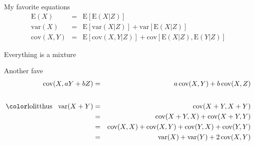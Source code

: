 \documentclass[aspectratio=169,12pt,t]{beamer}
\begin{document}
\begin{frame}[c]{My favorite equations}
  \begin{eqnarray*}
    \text{E}(X) & = & \text{E}[ \text{E}(X|Z) ] \\[18pt]
    \text{var}(X) & = & \text{E}[ \text{var}(X|Z) ] + \text{var}[ \text{E}(X|Z) ] \\[18pt]
    \text{cov}(X,Y) & = & \text{E}[ \text{cov}(X,Y|Z) ] + \text{cov}[ \text{E}(X|Z), \text{E}(Y|Z) ]
  \end{eqnarray*}

  \bigskip\bigskip

  \hfill {\lolit Everything is a mixture}


\note{
}

\end{frame}


\begin{frame}[c]{Another fave}
  \begin{eqnarray*}
    \text{cov}(X, aY+bZ) & = & a \, \text{cov}(X,Y) + b \, \text{cov}(X,Z) \\[18pt]
    \text{{\lolit thus} \, var}(X+Y) & = & \text{cov}(X+Y,X+Y) \\
    & = & \text{cov}(X+Y, X) + \text{cov}(X+Y, Y) \\
    & = & \text{cov}(X, X) + \text{cov}(X, Y) + \text{cov}(Y,X) + \text{cov}(Y,Y) \\
    & = & \text{var}(X) + \text{var}(Y) + 2 \, \text{cov}(X,Y)
    \end{eqnarray*}

\note{
}

\end{frame}


\begin{frame}[c]{}

\note{
}

\end{frame}

\begin{frame}[c]{}

\note{
}

\end{frame}
\end{document}
